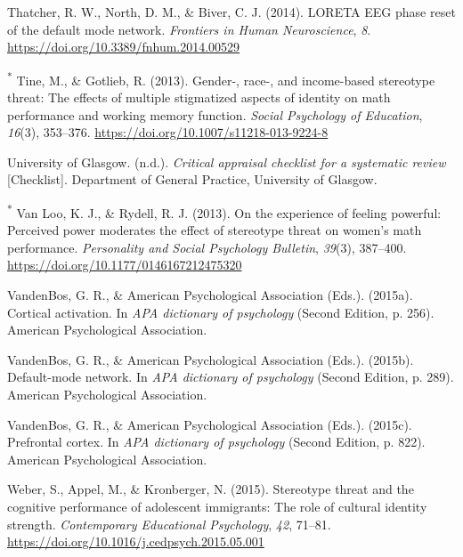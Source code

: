 \documentclass[
  stu, a4paper,floatsintext]{apa7}
\newlength{\cslhangindent}
\newenvironment{CSLReferences}[2] %
 {\begin{list}{}{%
  \setlength{\itemindent}{0pt}
  \setlength{\leftmargin}{0pt}
  \setlength{\parsep}{0pt}
  \ifodd #1
   \setlength{\leftmargin}{\cslhangindent}
   \setlength{\itemindent}{-1\cslhangindent}
  \fi
  \setlength{\itemsep}{#2\baselineskip}}}
 {\end{list}}
\begin{document}
\begin{CSLReferences}{1}{0}
Thatcher, R. W., North, D. M., \& Biver, C. J. (2014). {LORETA EEG} phase reset of the default mode network. \emph{Frontiers in Human Neuroscience}, \emph{8}. \url{https://doi.org/10.3389/fnhum.2014.00529}

\textsuperscript{*} Tine, M., \& Gotlieb, R. (2013). Gender-, race-, and income-based stereotype threat: The effects of multiple stigmatized aspects of identity on math performance and working memory function. \emph{Social Psychology of Education}, \emph{16}(3), 353--376. \url{https://doi.org/10.1007/s11218-013-9224-8}

University of Glasgow. (n.d.). \emph{Critical appraisal checklist for a systematic review} {[}Checklist{]}. Department of General Practice, University of Glasgow.

\textsuperscript{*} Van Loo, K. J., \& Rydell, R. J. (2013). On the experience of feeling powerful: {Perceived} power moderates the effect of stereotype threat on women's math performance. \emph{Personality and Social Psychology Bulletin}, \emph{39}(3), 387--400. \url{https://doi.org/10.1177/0146167212475320}

VandenBos, G. R., \& American Psychological Association (Eds.). (2015a). Cortical activation. In \emph{{APA} dictionary of psychology} (Second Edition, p. 256). American Psychological Association.

VandenBos, G. R., \& American Psychological Association (Eds.). (2015b). Default-mode network. In \emph{{APA} dictionary of psychology} (Second Edition, p. 289). American Psychological Association.

VandenBos, G. R., \& American Psychological Association (Eds.). (2015c). Prefrontal cortex. In \emph{{APA} dictionary of psychology} (Second Edition, p. 822). American Psychological Association.

Weber, S., Appel, M., \& Kronberger, N. (2015). Stereotype threat and the cognitive performance of adolescent immigrants: {The} role of cultural identity strength. \emph{Contemporary Educational Psychology}, \emph{42}, 71--81. \url{https://doi.org/10.1016/j.cedpsych.2015.05.001}


\end{CSLReferences}
\end{document}
